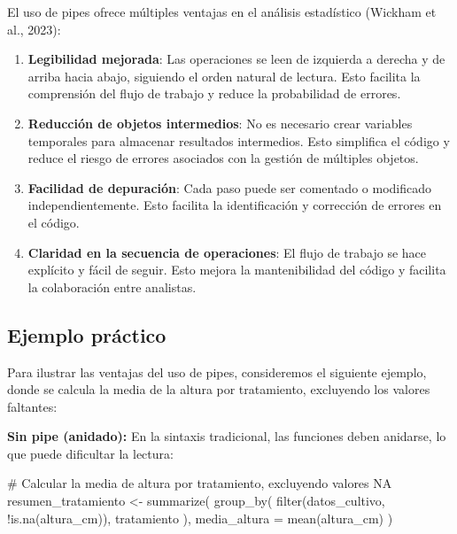 \documentclass[
  spanish,
  a4paper,
  DIV=11,
  numbers=noendperiod,
  onepage,
  openany]{scrreprt}
\newenvironment{Shaded}{\begin{snugshade}}{\end{snugshade}}
\newcommand{\AttributeTok}[1]{\textcolor[rgb]{0.40,0.45,0.13}{#1}}
\newcommand{\CommentTok}[1]{\textcolor[rgb]{0.37,0.37,0.37}{#1}}
\newcommand{\FunctionTok}[1]{\textcolor[rgb]{0.28,0.35,0.67}{#1}}
\newcommand{\NormalTok}[1]{\textcolor[rgb]{0.00,0.23,0.31}{#1}}
\newcommand{\OtherTok}[1]{\textcolor[rgb]{0.00,0.23,0.31}{#1}}
\newcommand{\SpecialCharTok}[1]{\textcolor[rgb]{0.37,0.37,0.37}{#1}}
\begin{document}
El uso de pipes ofrece múltiples ventajas en el análisis estadístico
(Wickham et al., 2023):

\begin{enumerate}
\def\labelenumi{\arabic{enumi}.}
\item
  \textbf{Legibilidad mejorada}: Las operaciones se leen de izquierda a
  derecha y de arriba hacia abajo, siguiendo el orden natural de
  lectura. Esto facilita la comprensión del flujo de trabajo y reduce la
  probabilidad de errores.
\item
  \textbf{Reducción de objetos intermedios}: No es necesario crear
  variables temporales para almacenar resultados intermedios. Esto
  simplifica el código y reduce el riesgo de errores asociados con la
  gestión de múltiples objetos.
\item
  \textbf{Facilidad de depuración}: Cada paso puede ser comentado o
  modificado independientemente. Esto facilita la identificación y
  corrección de errores en el código.
\item
  \textbf{Claridad en la secuencia de operaciones}: El flujo de trabajo
  se hace explícito y fácil de seguir. Esto mejora la mantenibilidad del
  código y facilita la colaboración entre analistas.
\end{enumerate}

\subsection{Ejemplo práctico}\label{ejemplo-pruxe1ctico-3}

Para ilustrar las ventajas del uso de pipes, consideremos el siguiente
ejemplo, donde se calcula la media de la altura por tratamiento,
excluyendo los valores faltantes:

\textbf{Sin pipe (anidado):} En la sintaxis tradicional, las funciones
deben anidarse, lo que puede dificultar la lectura:

\begin{Shaded}
\begin{Highlighting}[]
\CommentTok{\# Calcular la media de altura por tratamiento, excluyendo valores NA}
\NormalTok{resumen\_tratamiento }\OtherTok{\textless{}{-}} \FunctionTok{summarize}\NormalTok{(}
  \FunctionTok{group\_by}\NormalTok{(}
    \FunctionTok{filter}\NormalTok{(datos\_cultivo, }\SpecialCharTok{!}\FunctionTok{is.na}\NormalTok{(altura\_cm)),}
\NormalTok{    tratamiento}
\NormalTok{  ),}
  \AttributeTok{media\_altura =} \FunctionTok{mean}\NormalTok{(altura\_cm)}
\NormalTok{)}
\end{Highlighting}
\end{Shaded}
\end{document}
